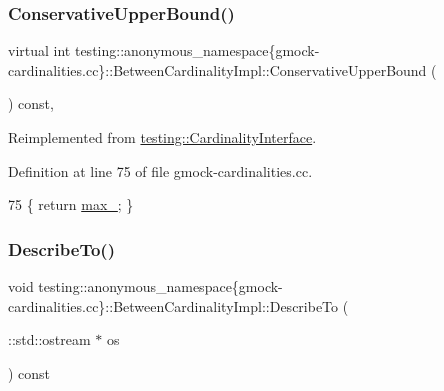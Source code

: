 \subsubsection{\texorpdfstring{Conservative\+Upper\+Bound()}{ConservativeUpperBound()}}
{\footnotesize\ttfamily virtual int testing\+::anonymous\+\_\+namespace\{gmock-\/cardinalities.\+cc\}\+::Between\+Cardinality\+Impl\+::\+Conservative\+Upper\+Bound (\begin{DoxyParamCaption}{ }\end{DoxyParamCaption}) const\hspace{0.3cm}{\ttfamily [inline]}, {\ttfamily [virtual]}}



Reimplemented from \hyperlink{classtesting_1_1CardinalityInterface_ac741b28605377d603623dddf4b1c8d33}{testing\+::\+Cardinality\+Interface}.



Definition at line 75 of file gmock-\/cardinalities.\+cc.


\begin{DoxyCode}
75 \{ \textcolor{keywordflow}{return} \hyperlink{classtesting_1_1anonymous__namespace_02gmock-cardinalities_8cc_03_1_1BetweenCardinalityImpl_acf6f35b47bf9f52b714ccceb22255aeb}{max\_}; \}
\end{DoxyCode}
\mbox{\label{classtesting_1_1anonymous__namespace_02gmock-cardinalities_8cc_03_1_1BetweenCardinalityImpl_a8768e68b374d5a1103890284ea4fe332}} 
\subsubsection{\texorpdfstring{Describe\+To()}{DescribeTo()}}
{\footnotesize\ttfamily void testing\+::anonymous\+\_\+namespace\{gmock-\/cardinalities.\+cc\}\+::Between\+Cardinality\+Impl\+::\+Describe\+To (\begin{DoxyParamCaption}\item[{\+::std\+::ostream $\ast$}]{os }\end{DoxyParamCaption}) const\hspace{0.3cm}{\ttfamily [virtual]}}



